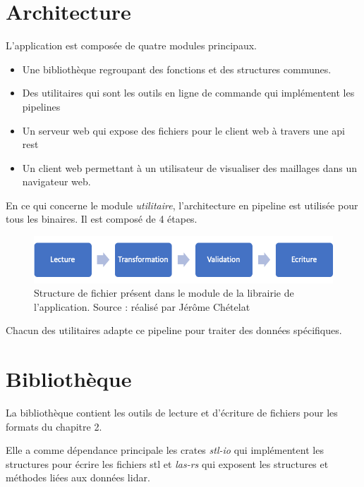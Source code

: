 \section{Architecture}

L'application est composée de quatre modules principaux.

\begin{itemize}
	\item Une bibliothèque regroupant des fonctions et des structures communes.
	\item Des utilitaires qui sont les outils en ligne de commande qui
		implémentent les pipelines 
	\item Un serveur web qui expose des fichiers pour le client web à
		travers une api \gls{rest}
	\item Un client web permettant à un utilisateur de visualiser des maillages
		dans un navigateur web.
\end{itemize}

En ce qui concerne le module \textit{utilitaire}, l'architecture en pipeline est
utilisée pour tous les binaires. Il est composé de 4 étapes. 

\begin{figure}[htbp!]
    \centering
    \includegraphics[width=0.7\linewidth]{figures/pipeline_process.png}
    \caption{Structure de fichier présent dans le module de la librairie de l'application. Source : réalisé par Jérôme Chételat}
    \label{fig:pipeline_process}
\end{figure}

Chacun des utilitaires adapte ce pipeline pour traiter des données spécifiques.

\section{Bibliothèque}

La bibliothèque contient les outils de lecture et d'écriture de fichiers pour les formats du chapitre 2.

Elle a comme dépendance principale les crates \textit{stl-io}
qui implémentent les structures pour écrire les fichiers \gls{stl} 
et \textit{las-rs} qui exposent les structures et méthodes liées aux données lidar.

